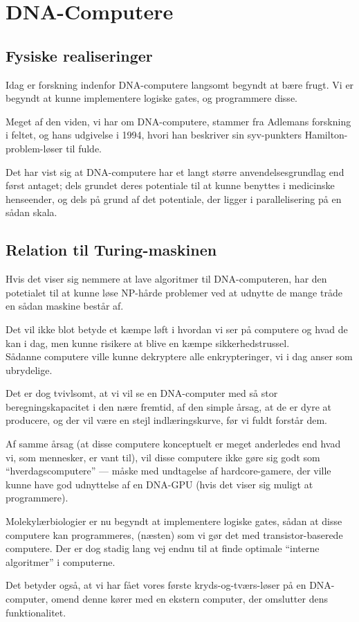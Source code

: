 
\section{DNA-Computere}

\subsection{Fysiske realiseringer}
Idag er forskning indenfor DNA-computere langsomt begyndt at bære frugt. Vi
er begyndt at kunne implementere logiske gates, og programmere disse.

Meget af den viden, vi har om DNA-computere, stammer fra Adlemans forskning i
feltet, og hans udgivelse i 1994, hvori han beskriver sin syv-punkters
Hamilton-problem-løser til fulde.

Det har vist sig at DNA-computere har et langt større anvendelsesgrundlag end
først antaget; dels grundet deres potentiale til at kunne benyttes i medicinske
henseender, og dels på grund af det potentiale, der ligger i parallelisering
på en sådan skala. 

\subsection{Relation til Turing-maskinen}
Hvis det viser sig nemmere at lave algoritmer til DNA-computeren, har den
potetialet til at kunne løse NP-hårde problemer ved at udnytte de mange tråde
en sådan maskine består af.

Det vil ikke blot betyde et kæmpe løft i hvordan vi ser på computere og
hvad de kan i dag, men kunne risikere at blive en kæmpe sikkerhedstrussel.\\
Sådanne computere ville kunne dekryptere alle enkrypteringer, vi i dag anser
som ubrydelige.

Det er dog tvivlsomt, at vi vil se en DNA-computer med så stor beregningskapacitet
i den nære fremtid, af den simple årsag, at de er dyre at producere, og der vil
være en stejl indlæringskurve, før vi fuldt forstår dem.

Af samme årsag (at disse computere konceptuelt er meget anderledes end hvad
vi, som mennesker, er vant til), vil disse computere ikke gøre sig godt som
``hverdagscomputere'' --- måske med undtagelse af hardcore-gamere, der ville
kunne have god udnyttelse af en DNA-GPU (hvis det viser sig muligt at
programmere).

Molekylærbiologier er nu begyndt at implementere logiske gates, sådan at
disse computere kan programmeres, (næsten) som vi gør det med transistor-baserede
computere. Der er dog stadig lang vej endnu til at finde optimale ``interne algoritmer''
i computerne.

Det betyder også, at vi har fået vores første kryds-og-tværs-løser på en
DNA-computer, omend denne kører med en ekstern computer, der omslutter
dens funktionalitet.


